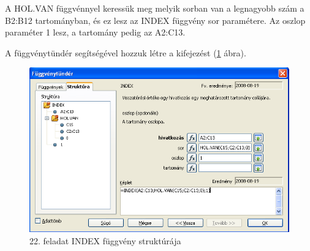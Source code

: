 A HOL.VAN függvénnyel keressük meg melyik sorban van a legnagyobb
szám a B2:B12 tartományban, és ez lesz az INDEX függvény sor
paramétere. Az oszlop paraméter 1 lesz, a tartomány pedig az
A2:C13.

A függvénytündér segítségével hozzuk létre a
kifejezést (\ref{INDEXFüggvény} ábra).

\begin{figure}[!h]
\begin{center}
\includegraphics[width=15.999cm]{oocalcv2-img103.png}
\caption{22. feladat INDEX függvény struktúrája}\label{INDEXFüggvény}
\end{center}
\end{figure}

